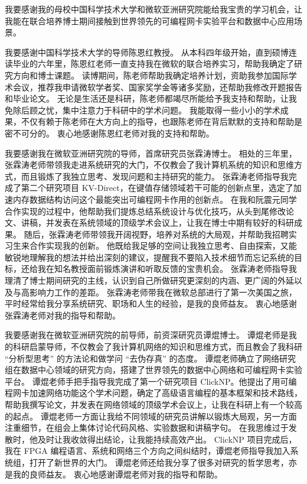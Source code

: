 
\begin{acknowledgements}

我要感谢我的母校中国科学技术⼤学和微软亚洲研究院能给我宝贵的学习机会，让我能在联合培养博士期间接触到世界领先的可编程网卡实验平台和数据中心应用场景。

我要感谢中国科学技术⼤学的导师陈恩红教授。
从本科四年级开始，直到硕博连读毕业的六年里，陈恩红老师一直支持我在微软的联合培养实习，帮助我确定了研究方向和博士课题。
读博期间，陈老师帮助我确定培养计划，资助我参加国际学术会议，推荐我申请微软学者奖、国家奖学金等诸多奖励，还帮助我修改开题报告和毕业论文。
无论是生活还是科研，陈老师都竭尽所能给予我⽀持和帮助，让我免除后顾之忧，集中注意⼒于科研中的学术问题。
我能取得一些小小的学术成果，不仅有赖于陈⽼师在大方向上的指导，也跟陈老师在背后默默的⽀持和帮助是密不可分的。
衷心地感谢陈恩红老师对我的支持和帮助。

我要感谢我在微软亚洲研究院的导师，首席研究员张霖涛博士。
相处的三年里，张霖涛老师带领我走进系统研究的大门，不仅教会了我计算机系统的知识和思维方式，而且锻炼了我独立思考、发现问题和主持研究的能力。
张霖涛老师指导我完成了第二个研究项目 KV-Direct，在键值存储领域若干可能的创新点里，选定了加速内存数据结构访问这个最能突出可编程网卡作用的创新点。
在我和阮震元同学合作实现的过程中，他帮助我们提炼总结系统设计与优化技巧，从头到尾修改论文、讲稿，并发表在系统领域的顶级学术会议上，让我在博士中期有较好的科研成果。
随后，张霖涛老师带领我开阔视野，培养对系统的大局观，并帮助我招聘实习生来合作实现我的创新。
他既给我足够的空间让我独立思考、自由探索，又能敏锐地理解我的想法并给出深刻的建议，提醒我不要陷入技术细节而忘记系统的目标，还给我在知名教授面前锻炼演讲和听取反馈的宝贵机会。
张霖涛老师指导我理清了博士期间研究的主线，认识到自己所做研究更深刻的内涵、更广阔的外延以及与高影响力工作的差距。
张霖涛老师带我在微软总部进行了第一次美国之旅，平时经常给我分享系统研究、职场和人生的经验，是我的良师益友。
衷心地感谢张霖涛老师对我的指导和帮助。

我要感谢我在微软亚洲研究院的前导师，前资深研究员谭焜博⼠。
谭焜老师是我的科研启蒙导师，不仅教会了我计算机⽹络的知识和思维⽅式，⽽且教会了我科研 ``分析型思考'' 的⽅法论和做学问 ``去伪存真'' 的态度。
谭焜老师确立了网络研究组在数据中心领域的研究方向，搭建了世界领先的数据中心网络和可编程网卡实验平台。
谭焜老师手把手指导我完成了第一个研究项目 ClickNP。他提出了用可编程网卡加速网络功能这个学术问题，确定了高级语言编程的基本框架和技术路线，帮助我撰写论文，并发表在网络领域的顶级学术会议上，让我在科研上有一个较高的起点。
谭焜老师一方面让我给不同领域的研究员讲解以锻炼大局观，另一方面注重细节，在组会上集体讨论代码风格、实验数据和讲稿字句。
在我思维过于发散时，他及时让我收敛得出结论，让我能持续高效产出。
ClickNP 项目完成后，我在 FPGA 编程语言、系统和网络三个方向之间纠结时，谭焜老师指导我加入系统组，打开了新世界的大门。
谭焜老师还给我分享了很多对研究的哲学思考，亦是我的良师益友。
衷⼼地感谢谭焜⽼师对我的指导和帮助。


\end{acknowledgements}
